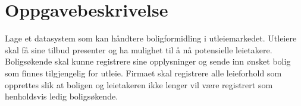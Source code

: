 \section{Oppgavebeskrivelse}
Lage et datasystem som kan håndtere boligformidling i utleiemarkedet. Utleiere skal få sine tilbud presenter og ha mulighet til å nå potensielle leietakere. Boligsøkende skal kunne registrere sine opplysninger og sende inn ønsket bolig som finnes tilgjengelig for utleie. Firmaet skal registrere alle leieforhold som opprettes slik at boligen og leietakeren ikke lenger vil være registrert som henholdsvis ledig boligsøkende. 

